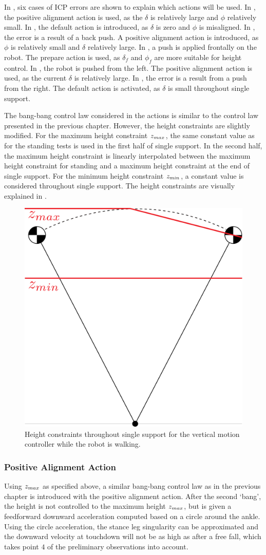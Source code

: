 In , six cases of \ac{ICP} errors are shown to explain which actions will be used. In , the positive alignment action is used, as the $\delta$ is relatively large and $\phi$ relatively small. In , the default action is introduced, as $\delta$ is zero and $\phi$ is misaligned. In , the error is a result of a back push. A positive alignment action is introduced, as $\phi$ is relatively small and $\delta$ relatively large. In , a push is applied frontally on the robot. The prepare action is used, as $\delta_f$ and $\phi_f$ are more suitable for height control. In , the robot is pushed from the left. The positive alignment action is used, as the current $\delta$ is relatively large. In , the error is a result from a push from the right. The default action is activated, as $\delta$ is small throughout single support.

The bang-bang control law considered in the actions is similar to the control law presented in the previous chapter. However, the height constraints are slightly modified. For the maximum height constraint $z_{max}$, the same constant value as for the standing tests is used in the first half of single support. In the second half, the maximum height constraint is linearly interpolated between the maximum height constraint for standing and a maximum height constraint at the end of single support.  For the minimum height constraint $z_{min}$, a constant value is considered throughout single support. The height constraints are visually explained in .
\begin{figure}
\centering
  \includegraphics[width=.4\linewidth]{STYLESTUFF/heightconstraints.png}
   \caption{Height constraints throughout single support for the vertical motion controller while the robot is walking.}
    \label{fig:heightconstraints}
\end{figure} 
\subsubsection{Positive Alignment Action} 
Using $z_{max}$ as specified above, a similar bang-bang control law as in the previous chapter is introduced with the positive alignment action. After the second `bang', the height is not controlled to the maximum height $z_{max}$, but is given a feedforward downward acceleration computed based on a circle around the ankle. Using the circle acceleration, the stance leg singularity can be approximated and the downward velocity at touchdown will not be as high as after a free fall, which takes point $4$ of the preliminary observations into account. 

